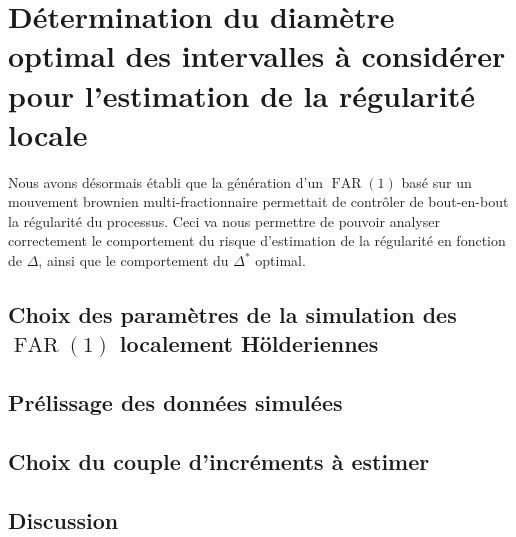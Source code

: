 \chapter{Détermination du diamètre optimal des intervalles à considérer pour l'estimation de la régularité locale }
\label{chap:determination-delta}
\minitoc%

Nous avons désormais établi que la génération d'un $\operatorname{FAR}(1)$ basé sur un mouvement brownien multi-fractionnaire permettait de contrôler de bout-en-bout la régularité du processus. Ceci va nous permettre de pouvoir analyser correctement le comportement du risque d'estimation de la régularité en fonction de $\Delta$, ainsi que le comportement du $\Delta^*$ optimal.

\section{Choix des paramètres de la simulation des $\operatorname{FAR}(1)$ localement Hölderiennes}
\label{sec:choix-des-parametres-de-la-simulation}


\section{Prélissage des données simulées}
\label{sec:prelissage-des-donnees-simulees}


\section{Choix du couple d'incréments à estimer}
\label{sec:choix-couple-increment}


\section{Discussion}
\label{sec:methodo_discussion}
